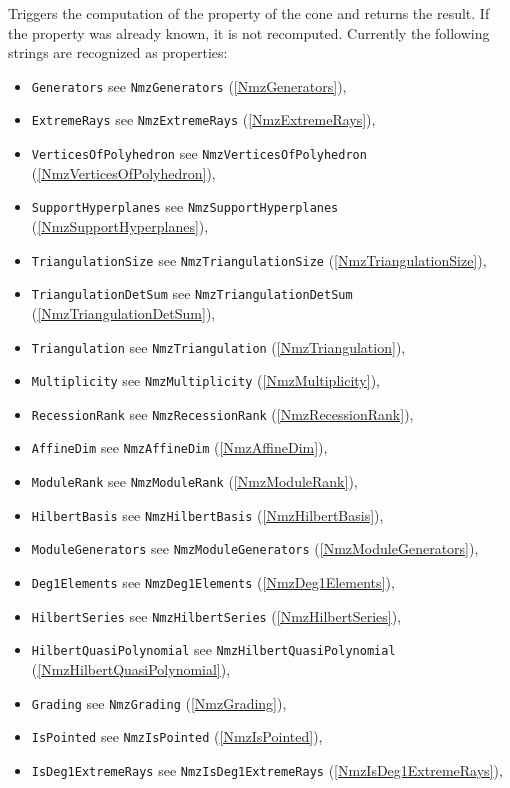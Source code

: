 \documentclass[a4paper,11pt]{report}
\begin{document}
{{{ Triggers the computation of the property of the cone and returns the result.
If the property was already known, it is not recomputed. Currently the
following strings are recognized as properties: 
\begin{itemize}
\item \texttt{Generators} see \texttt{NmzGenerators} (\ref{NmzGenerators}),
\item \texttt{ExtremeRays} see \texttt{NmzExtremeRays} (\ref{NmzExtremeRays}),
\item \texttt{VerticesOfPolyhedron} see \texttt{NmzVerticesOfPolyhedron} (\ref{NmzVerticesOfPolyhedron}),
\item \texttt{SupportHyperplanes} see \texttt{NmzSupportHyperplanes} (\ref{NmzSupportHyperplanes}),
\item \texttt{TriangulationSize} see \texttt{NmzTriangulationSize} (\ref{NmzTriangulationSize}),
\item \texttt{TriangulationDetSum} see \texttt{NmzTriangulationDetSum} (\ref{NmzTriangulationDetSum}),
\item \texttt{Triangulation} see \texttt{NmzTriangulation} (\ref{NmzTriangulation}),
\item \texttt{Multiplicity} see \texttt{NmzMultiplicity} (\ref{NmzMultiplicity}),
\item \texttt{RecessionRank} see \texttt{NmzRecessionRank} (\ref{NmzRecessionRank}),
\item \texttt{AffineDim} see \texttt{NmzAffineDim} (\ref{NmzAffineDim}),
\item \texttt{ModuleRank} see \texttt{NmzModuleRank} (\ref{NmzModuleRank}),
\item \texttt{HilbertBasis} see \texttt{NmzHilbertBasis} (\ref{NmzHilbertBasis}),
\item \texttt{ModuleGenerators} see \texttt{NmzModuleGenerators} (\ref{NmzModuleGenerators}),
\item \texttt{Deg1Elements} see \texttt{NmzDeg1Elements} (\ref{NmzDeg1Elements}),
\item \texttt{HilbertSeries} see \texttt{NmzHilbertSeries} (\ref{NmzHilbertSeries}),
\item \texttt{HilbertQuasiPolynomial} see \texttt{NmzHilbertQuasiPolynomial} (\ref{NmzHilbertQuasiPolynomial}),
\item \texttt{Grading} see \texttt{NmzGrading} (\ref{NmzGrading}),
\item \texttt{IsPointed} see \texttt{NmzIsPointed} (\ref{NmzIsPointed}),
\item \texttt{IsDeg1ExtremeRays} see \texttt{NmzIsDeg1ExtremeRays} (\ref{NmzIsDeg1ExtremeRays}),

\end{itemize}}}}
\end{document}

